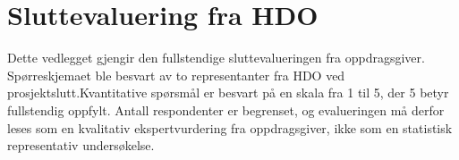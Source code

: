 \chapter{Sluttevaluering fra HDO}
\label{app:hdo-eval}


Dette vedlegget gjengir den fullstendige sluttevalueringen fra
oppdragsgiver. Spørreskjemaet ble besvart av to representanter
fra HDO ved prosjektslutt.Kvantitative spørsmål er besvart på en skala fra 1 til 5, der 5
betyr fullstendig oppfylt. Antall respondenter er
begrenset, og evalueringen må derfor leses som en kvalitativ
ekspertvurdering fra oppdragsgiver, ikke som en statistisk
representativ undersøkelse.


